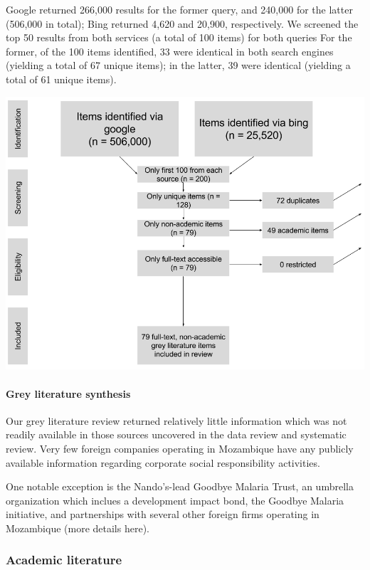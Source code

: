 \documentclass[]{elsarticle} %
\begin{document}
Google returned 266,000 results for the former query, and 240,000 for
the latter (506,000 in total); Bing returned 4,620 and 20,900,
respectively. We screened the top 50 results from both services (a total
of 100 items) for both queries For the former, of the 100 items
identified, 33 were identical in both search engines (yielding a total
of 67 unique items); in the latter, 39 were identical (yielding a total
of 61 unique items).

\begin{center}
\includegraphics[width=400pt]{img/prisma_grey.png}
\end{center}

\paragraph{Grey literature synthesis}\label{grey-literature-synthesis}

Our grey literature review returned relatively little information which
was not readily available in those sources uncovered in the data review
and systematic review. Very few foreign companies operating in
Mozambique have any publicly available information regarding corporate
social responsibility activities.

One notable exception is the Nando's-lead Goodbye Malaria Trust, an
umbrella organization which inclues a development impact bond, the
Goodbye Malaria initiative, and partnerships with several other foreign
firms operating in Mozambique (more details here).

\subsubsection{Academic literature}\label{academic-literature-1}
\end{document}
